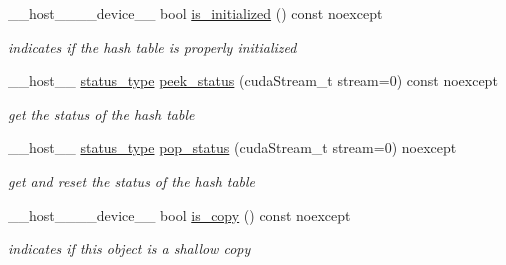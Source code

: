 \begin{DoxyCompactItemize}
\+\_\+\+\_\+host\+\_\+\+\_\+\+\_\+\+\_\+device\+\_\+\+\_\+ bool \hyperlink{classwarpcore_1_1SingleValueHashTable_ae366b3fd0d7edbac68a939fe580df9a4}{is\+\_\+initialized} () const noexcept
\begin{DoxyCompactList}\small\item\em indicates if the hash table is properly initialized \end{DoxyCompactList}\item 
\+\_\+\+\_\+host\+\_\+\+\_\+ \hyperlink{classwarpcore_1_1Status}{status\+\_\+type} \hyperlink{classwarpcore_1_1SingleValueHashTable_a0d202448fc1427da9d4a745ec28b5976}{peek\+\_\+status} (cuda\+Stream\+\_\+t stream=0) const noexcept
\begin{DoxyCompactList}\small\item\em get the status of the hash table \end{DoxyCompactList}\item 
\+\_\+\+\_\+host\+\_\+\+\_\+ \hyperlink{classwarpcore_1_1Status}{status\+\_\+type} \hyperlink{classwarpcore_1_1SingleValueHashTable_ad69a615811e4116c99b15648e9259bf7}{pop\+\_\+status} (cuda\+Stream\+\_\+t stream=0) noexcept
\begin{DoxyCompactList}\small\item\em get and reset the status of the hash table \end{DoxyCompactList}\item 
\+\_\+\+\_\+host\+\_\+\+\_\+\+\_\+\+\_\+device\+\_\+\+\_\+ bool \hyperlink{classwarpcore_1_1SingleValueHashTable_ad27e3e8fab3e2725d8437e4252566768}{is\+\_\+copy} () const noexcept
\begin{DoxyCompactList}\small\item\em indicates if this object is a shallow copy \end{DoxyCompactList}\end{DoxyCompactItemize}
